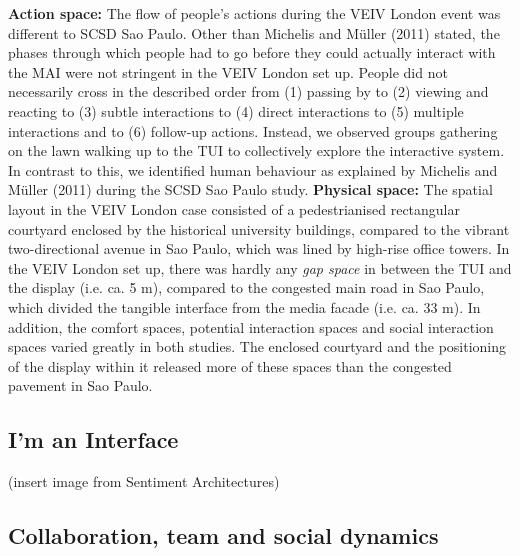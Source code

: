 \textbf{Action space:} The flow of people’s actions during the VEIV London event was different to SCSD Sao Paulo. 
Other than Michelis and Müller (2011) stated, the phases through which people had to go before they could actually interact with the MAI were not stringent in the VEIV London set up. 
People did not necessarily cross in the described order from (1) passing by to (2) viewing and reacting to (3) subtle interactions to (4) direct interactions to (5) multiple interactions and to (6) follow-up actions.
Instead, we observed groups gathering on the lawn walking up to the TUI to collectively explore the interactive system. In contrast to this, we identified human behaviour as explained by Michelis and Müller (2011) during the SCSD Sao Paulo study.
\textbf{Physical space:} The spatial layout in the VEIV London case consisted of a pedestrianised rectangular courtyard enclosed by the historical university buildings, compared to the vibrant two-directional avenue in Sao Paulo, which was lined by high-rise office towers.
In the VEIV London set up, there was hardly any \textit{gap space} in between the TUI and the display (i.e. ca. 5 m), compared to the congested main road in Sao Paulo, which divided the tangible interface from the
media facade (i.e. ca. 33 m). 
In addition, the comfort spaces, potential interaction spaces and social interaction spaces varied greatly in both studies. 
The enclosed courtyard and the positioning of the display within it released more of these spaces than the congested pavement in Sao Paulo.



\subsection*{I'm an Interface}

(insert image from Sentiment Architectures)



\subsection*{Collaboration, team and social dynamics}

